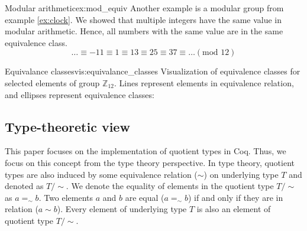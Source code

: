 \begin{example}{Modular arithmetic}{ex:mod_equiv}
Another example is a modular group from example \ref{ex:clock}. We showed that multiple integers have the same value in modular arithmetic. Hence, all numbers with the same value are in the same equivalence class.
$$ \dots \equiv -11 \equiv 1 \equiv 13 \equiv 25 \equiv 37 \equiv \dots (\textrm{mod } 12) $$
\end{example}
\begin{vis}[G]{Equivalance classes}{vis:equivalance_classes}
Visualization of equivalence classes for selected elements of group $\mathbb{Z}_{12}$. Lines represent elements in equivalence relation, and ellipses represent equivalence classes:
\begin{center}
\end{center}
\end{vis}

\subsection{Type-theoretic view}
This paper focuses on the implementation of quotient types in Coq. Thus, we focus on this concept from the type theory perspective. In type theory, quotient types are also induced by some equivalence relation ($\sim$) on underlying type $T$ and denoted as $T/\sim$. We denote the equality of elements in the quotient type $T/\sim$ as $a =_\sim b$. Two elements $a$ and $b$ are equal ($a =_\sim b$) if and only if they are in relation ($a \sim b$). Every element of underlying type $T$ is also an element of quotient type $T/\sim$.

